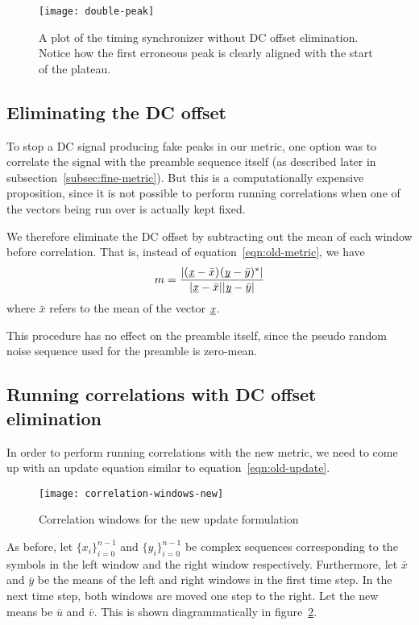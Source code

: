 \begin{figure}[h]
	\centering
	\texttt{[image: double-peak]}
	\caption{A plot of the timing synchronizer without DC offset elimination.
	         Notice how the first erroneous peak is clearly aligned with the
	         start of the plateau.}
	\label{fig:double-peak}
\end{figure}

\subsection{Eliminating the DC offset}

To stop a DC signal producing fake peaks in our metric, one option was to
correlate the signal with the preamble sequence itself (as described later in
subsection~\ref{subsec:fine-metric}). But this is a computationally expensive
proposition, since it is not possible to perform running correlations when one
of the vectors being run over is actually kept fixed.

We therefore eliminate the DC offset by subtracting out the mean of each window
before correlation. That is, instead of equation~\ref{eqn:old-metric}, we have
\begin{equation} \label{eqn:new-metric}
	m = \frac{|\corr{(\ue{x}-\bar{x})}{(\ue{y}-\bar{y})}|}
	         {|\ue{x}-\bar{x}||\ue{y}-\bar{y}|}
\end{equation}
where $\bar{x}$ refers to the mean of the vector $\underbar{\emph{x}}$.

This procedure has no effect on the preamble itself, since the pseudo random
noise sequence used for the preamble is zero-mean.

\subsection{Running correlations with DC offset elimination}

In order to perform running correlations with the new metric, we need to
come up with an update equation similar to equation~\ref{eqn:old-update}.

\begin{figure}[h]
	\centering
	\texttt{[image: correlation-windows-new]}
	\caption{Correlation windows for the new update formulation}
	\label{fig:corr-win-new}
\end{figure}

As before, let $\{x_i\}_{i=0}^{n-1}$ and $\{y_i\}_{i=0}^{n-1}$ be complex
sequences corresponding to the symbols in the left window and the right window
respectively. Furthermore, let $\bar{x}$ and $\bar{y}$ be the means of the
left and right windows in the first time step. In the next time step, both
windows are moved one step to the right. Let the new means be $\bar{u}$ and
$\bar{v}$. This is shown diagrammatically in figure~\ref{fig:corr-win-new}.

